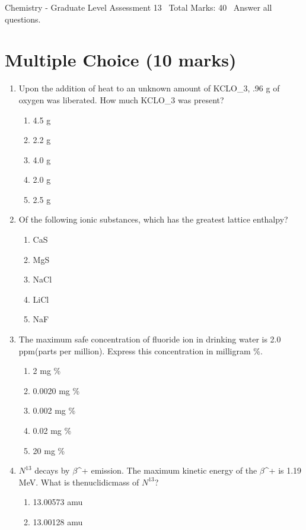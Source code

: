 \documentclass[12pt]{article}
\begin{document}
\begin{center}
Chemistry - Graduate Level Assessment 13 \
Total Marks: 40 \
Answer all questions.
\end{center}

\section*{Multiple Choice (10 marks)}
\begin{enumerate}[label=\arabic*.]
\item Upon the addition of heat to an unknown amount of KCLO\_3, .96 g of oxygen was liberated. How much KCLO\_3 was present?
\begin{enumerate}[label=(\alph*)]
    \item 4.5 g
    \item 2.2 g
    \item 4.0 g
    \item 2.0 g
    \item 2.5 g
\end{enumerate}
\item Of the following ionic substances, which has the greatest lattice enthalpy?
\begin{enumerate}[label=(\alph*)]
    \item CaS
    \item MgS
    \item NaCl
    \item LiCl
    \item NaF
\end{enumerate}
\item The maximum safe concentration of fluoride ion in drinking water is 2.0 ppm(parts per million). Express this concentration in milligram \%.
\begin{enumerate}[label=(\alph*)]
    \item 2 mg \%
    \item 0.0020 mg \%
    \item 0.002 mg \%
    \item 0.02 mg \%
    \item 20 mg \%
\end{enumerate}
\item $N^13$ decays by \ensuremath{\beta}^+ emission. The maximum kinetic energy of the \ensuremath{\beta}^+ is 1.19 MeV. What is thenuclidicmass of $N^13$?
\begin{enumerate}[label=(\alph*)]
    \item 13.00573 amu
    \item 13.00128 amu

\end{enumerate}
\end{enumerate}
\end{document}
